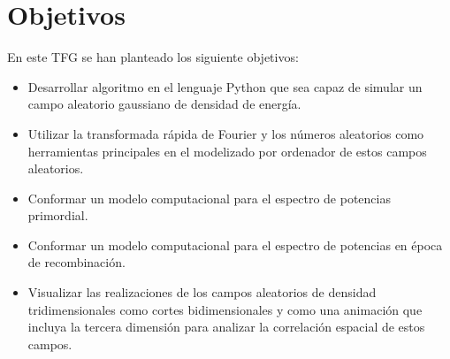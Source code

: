 \chapter{Objetivos}
En este TFG se han planteado los siguiente objetivos:
\begin{itemize}
    \item Desarrollar algoritmo en el lenguaje Python que sea capaz de simular un campo aleatorio gaussiano de densidad de energía.
    \item Utilizar la transformada rápida de Fourier y los números aleatorios como herramientas principales en el modelizado por ordenador de estos campos aleatorios.
    \item Conformar un modelo computacional para el espectro de potencias primordial.
    \item Conformar un modelo computacional para el espectro de potencias en época de recombinación.
    \item Visualizar las realizaciones de los campos aleatorios de densidad tridimensionales como cortes bidimensionales y como una animación que incluya la tercera dimensión para analizar la correlación espacial de estos campos.
\end{itemize}